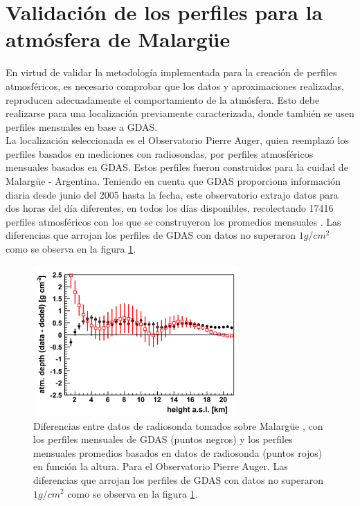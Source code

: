 \newpage 
\section{Validaci\'on de los perfiles para la atm\'osfera de Malarg\"ue}\label{sec:ref2}

En virtud de validar la metodología implementada para la creación de perfiles atmosféricos, es necesario comprobar que los datos y aproximaciones realizadas, reproducen adecuadamente el comportamiento de la atmósfera. Esto debe realizarse para una localización previamente caracterizada, donde también se usen perfiles mensuales en base a GDAS.\\

La localización seleccionada es el Observatorio Pierre Auger, quien reemplazó los perfiles basados en mediciones con radiosondas, por perfiles atmosféricos mensuales basados en GDAS. Estos perfiles fueron construidos para la cuidad de Malarg\"ue - Argentina. Teniendo en cuenta que GDAS proporciona información diaria desde junio del 2005 hasta la fecha, este observatorio extrajo datos para dos horas del día diferentes, en todos los días disponibles, recolectando 17416 perfiles atmosféricos con los que se construyeron los promedios mensuales  \citep{GAP_2011NEW}. Las diferencias que arrojan los perfiles de GDAS con datos no superaron $1 g/cm^{2}$ como se observa en la figura \ref{fig:fig17}.\\

\begin{figure}[htb!]
\centering
\includegraphics[width=0.7\textwidth]{Figs/nMMMvsGDAS.png}
\caption[Diferencias entre datos de radiosonda y GDAS en función de la altura.]{Diferencias entre datos de radiosonda tomados sobre Malarg\"ue  \citep{GDAS_Auger}, con los perfiles mensuales de GDAS (puntos negros) y los perfiles mensuales promedios basados en datos de radiosonda (puntos rojos) en función la altura. Para el Observatorio Pierre Auger. Las diferencias que arrojan los perfiles de GDAS con datos no superaron $1 g/cm^{2}$ como se observa en la figura \ref{fig:fig17}.}
 \label{fig:fig17}
 \end{figure}

